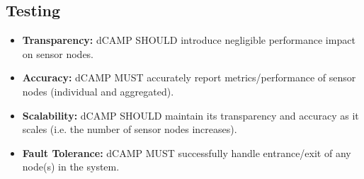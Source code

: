 \subsection{Testing}

\begin{itemize}

\item \textbf{Transparency:} dCAMP SHOULD introduce negligible performance impact on sensor nodes.

\item \textbf{Accuracy:} dCAMP MUST accurately report metrics/performance of sensor nodes (individual and aggregated).

\item \textbf{Scalability:} dCAMP SHOULD maintain its transparency and accuracy as it scales (i.e. the number of sensor nodes
increases).

\item \textbf{Fault Tolerance:} dCAMP MUST successfully handle entrance/exit of any node(s) in the system.

\end{itemize}
